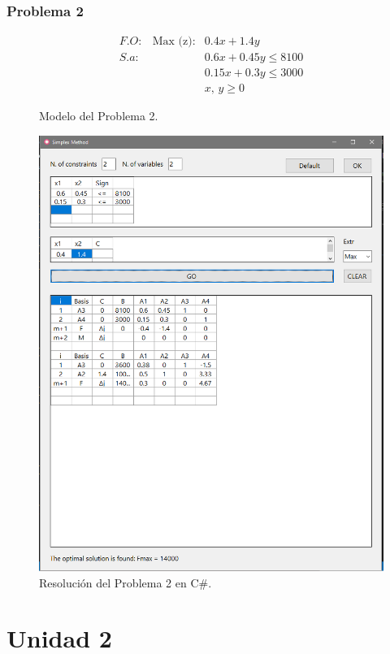 \documentclass[a4paper, 12pt]{article}
\begin{document}
    \subsubsection{Problema 2}
    \begin{figure}[H]
        \[\begin{matrix}
            F\!.\!O:&\text{Max (z)}:&0.4x+1.4y\\
            S.\!a: &&0.6x+0.45y\leq 8100\\
            &&0.15x+0.3y\leq 3000\\
            &&x,\, y\geq 0
        \end{matrix}\]
        \caption{Modelo del Problema 2.}
    \end{figure}
    \begin{figure}[H]
        \centering
        \includegraphics[width=12cm]{problema2.PNG}
        \caption{Resolución del Problema 2 en C\#.}
    \end{figure}
    \section{Unidad 2}
\end{document}
